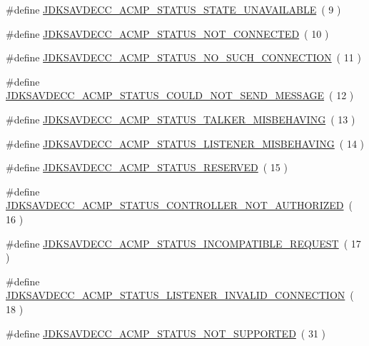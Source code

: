 \begin{DoxyCompactItemize}
\item 
\#define \hyperlink{group__acmp__status_gaa0d43331f3fdd97d17285680f2d6906e}{J\+D\+K\+S\+A\+V\+D\+E\+C\+C\+\_\+\+A\+C\+M\+P\+\_\+\+S\+T\+A\+T\+U\+S\+\_\+\+S\+T\+A\+T\+E\+\_\+\+U\+N\+A\+V\+A\+I\+L\+A\+B\+LE}~( 9 )
\item 
\#define \hyperlink{group__acmp__status_ga40ab14a65697832330444af6821bdfb6}{J\+D\+K\+S\+A\+V\+D\+E\+C\+C\+\_\+\+A\+C\+M\+P\+\_\+\+S\+T\+A\+T\+U\+S\+\_\+\+N\+O\+T\+\_\+\+C\+O\+N\+N\+E\+C\+T\+ED}~( 10 )
\item 
\#define \hyperlink{group__acmp__status_ga65a61a3594f3836520e12bcd2a9e4709}{J\+D\+K\+S\+A\+V\+D\+E\+C\+C\+\_\+\+A\+C\+M\+P\+\_\+\+S\+T\+A\+T\+U\+S\+\_\+\+N\+O\+\_\+\+S\+U\+C\+H\+\_\+\+C\+O\+N\+N\+E\+C\+T\+I\+ON}~( 11 )
\item 
\#define \hyperlink{group__acmp__status_gaabfc070883d0d37a7c8f3df323b55566}{J\+D\+K\+S\+A\+V\+D\+E\+C\+C\+\_\+\+A\+C\+M\+P\+\_\+\+S\+T\+A\+T\+U\+S\+\_\+\+C\+O\+U\+L\+D\+\_\+\+N\+O\+T\+\_\+\+S\+E\+N\+D\+\_\+\+M\+E\+S\+S\+A\+GE}~( 12 )
\item 
\#define \hyperlink{group__acmp__status_ga3ce11e7908a0fa82524e606d5a4673d9}{J\+D\+K\+S\+A\+V\+D\+E\+C\+C\+\_\+\+A\+C\+M\+P\+\_\+\+S\+T\+A\+T\+U\+S\+\_\+\+T\+A\+L\+K\+E\+R\+\_\+\+M\+I\+S\+B\+E\+H\+A\+V\+I\+NG}~( 13 )
\item 
\#define \hyperlink{group__acmp__status_ga6b8bb3abe5361acf0527a61b487b7651}{J\+D\+K\+S\+A\+V\+D\+E\+C\+C\+\_\+\+A\+C\+M\+P\+\_\+\+S\+T\+A\+T\+U\+S\+\_\+\+L\+I\+S\+T\+E\+N\+E\+R\+\_\+\+M\+I\+S\+B\+E\+H\+A\+V\+I\+NG}~( 14 )
\item 
\#define \hyperlink{group__acmp__status_ga2a0bb00b5882bc7974b16adca5cee6c3}{J\+D\+K\+S\+A\+V\+D\+E\+C\+C\+\_\+\+A\+C\+M\+P\+\_\+\+S\+T\+A\+T\+U\+S\+\_\+\+R\+E\+S\+E\+R\+V\+ED}~( 15 )
\item 
\#define \hyperlink{group__acmp__status_ga23b6d0c715caa1d69819e253aba647a0}{J\+D\+K\+S\+A\+V\+D\+E\+C\+C\+\_\+\+A\+C\+M\+P\+\_\+\+S\+T\+A\+T\+U\+S\+\_\+\+C\+O\+N\+T\+R\+O\+L\+L\+E\+R\+\_\+\+N\+O\+T\+\_\+\+A\+U\+T\+H\+O\+R\+I\+Z\+ED}~( 16 )
\item 
\#define \hyperlink{group__acmp__status_gaca712a617e0e224fb7f9125f708dcaad}{J\+D\+K\+S\+A\+V\+D\+E\+C\+C\+\_\+\+A\+C\+M\+P\+\_\+\+S\+T\+A\+T\+U\+S\+\_\+\+I\+N\+C\+O\+M\+P\+A\+T\+I\+B\+L\+E\+\_\+\+R\+E\+Q\+U\+E\+ST}~( 17 )
\item 
\#define \hyperlink{group__acmp__status_ga690d24051c8046af540ceaad4dae56b7}{J\+D\+K\+S\+A\+V\+D\+E\+C\+C\+\_\+\+A\+C\+M\+P\+\_\+\+S\+T\+A\+T\+U\+S\+\_\+\+L\+I\+S\+T\+E\+N\+E\+R\+\_\+\+I\+N\+V\+A\+L\+I\+D\+\_\+\+C\+O\+N\+N\+E\+C\+T\+I\+ON}~( 18 )
\item 
\#define \hyperlink{group__acmp__status_gaed07d087f1527132c0c9cd9aef72d1ce}{J\+D\+K\+S\+A\+V\+D\+E\+C\+C\+\_\+\+A\+C\+M\+P\+\_\+\+S\+T\+A\+T\+U\+S\+\_\+\+N\+O\+T\+\_\+\+S\+U\+P\+P\+O\+R\+T\+ED}~( 31 )
\end{DoxyCompactItemize}


